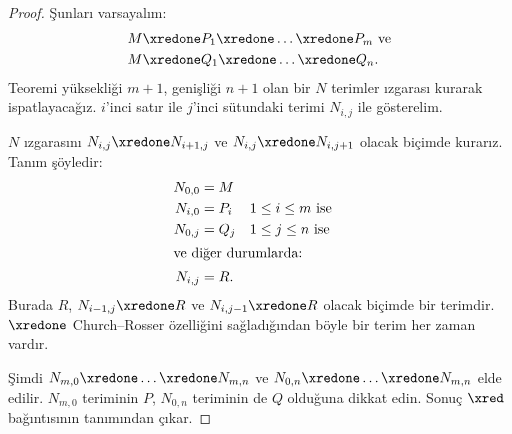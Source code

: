 \documentclass[../../../include/open-logic-section]{subfiles}
\begin{document}
\begin{proof}
  Şunları varsayalım:
  \begin{align*}
    M & \xredone P_1 \xredone \dots \xredone P_m \text{ ve}\\
    M & \xredone Q_1 \xredone \dots \xredone Q_n.
  \end{align*}
  Teoremi yüksekliği $m+1$, genişliği $n+1$ olan bir $N$ terimler ızgarası
  kurarak ispatlayacağız. $i$'inci satır ile $j$'inci sütundaki terimi
  $N_{i,j}$ ile gösterelim.

  $N$ ızgarasını $N_{i,j}\xredone N_{i+1,j}$ ve
  $N_{i,j}\xredone N_{i,j+1}$ olacak biçimde kurarız. Tanım şöyledir:
  \begin{align*}
    N_{0,0} &= M \\
    N_{i,0} &= P_i && \text{$1\le i\le m$ ise} \\
    N_{0,j} &= Q_j && \text{$1\le j\le n$ ise} \\
  \intertext{ve diğer durumlarda:}
    N_{i,j} &= R.
  \end{align*}
  Burada $R$, $N_{i-1,j}\xredone R$ ve $N_{i,j-1}\xredone R$ olacak
  biçimde bir terimdir. $\xredone$ Church--Rosser özelliğini sağladığından
  böyle bir terim her zaman vardır.

  Şimdi $N_{m,0}\xredone\dots\xredone N_{m,n}$ ve
  $N_{0,n}\xredone\dots\xredone N_{m,n}$ elde edilir. $N_{m,0}$ teriminin
  $P$, $N_{0,n}$ teriminin de $Q$ olduğuna dikkat edin. Sonuç $\xred$
  bağıntısının tanımından çıkar.
\end{proof}
\end{document}
